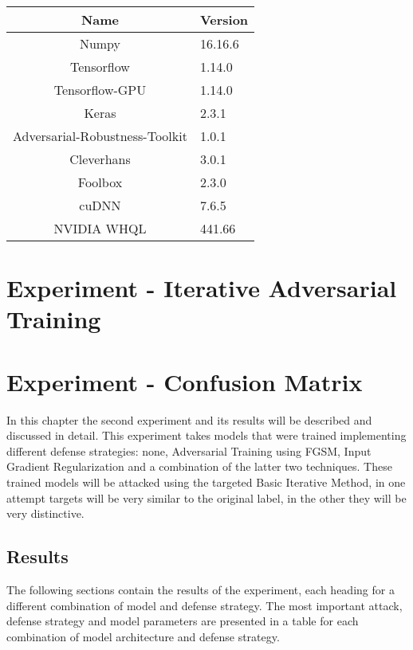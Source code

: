 \documentclass[draft,final]{vutinfth} %
\begin{document}
\begin{table}[h]
  \centering
  \begin{tabular}{cl}
    \toprule
Name                                    & Version   \\
    \midrule
    Numpy                               & 16.16.6	  \\
    Tensorflow                          & 1.14.0    \\
    Tensorflow-GPU                      & 1.14.0    \\
    Keras                               & 2.3.1     \\
    Adversarial-Robustness-Toolkit      & 1.0.1     \\
    Cleverhans                          & 3.0.1     \\
    Foolbox                             & 2.3.0     \\
		cuDNN																&	7.6.5			\\
		NVIDIA WHQL													& 441.66		\\
		
    
    \bottomrule
  \end{tabular}
\end{table}


\chapter{Experiment - Iterative Adversarial Training}

\chapter{Experiment - Confusion Matrix}

In this chapter the second experiment and its results will be described and discussed in detail.
This experiment takes models that were trained implementing different defense strategies: none, Adversarial Training using FGSM, Input Gradient Regularization and a combination of the latter two techniques.
These trained models will be attacked using the targeted Basic Iterative Method, in one attempt targets will be very similar to the original label, in the other they will be very distinctive.


\section{Results}

The following sections contain the results of the experiment, each heading for a different combination of model and defense strategy.
The most important attack, defense strategy and model parameters are presented in a table for each combination of model architecture and defense strategy.
\end{document}
